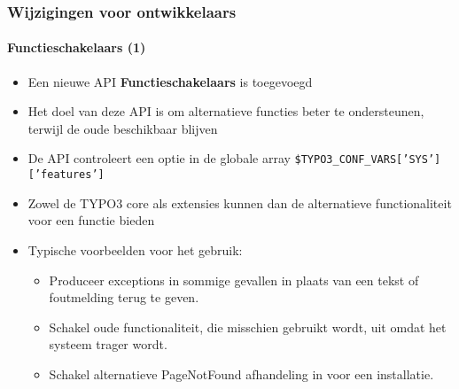 
\begin{frame}[fragile]
	\frametitle{Wijzigingen voor ontwikkelaars}
	\framesubtitle{Functieschakelaars (1)}

	\begin{itemize}
		\item Een nieuwe API \textbf{Functieschakelaars} is toegevoegd
		\item Het doel van deze API is om alternatieve functies beter te ondersteunen,
			terwijl de oude beschikbaar blijven
		\item De API controleert een optie in de globale array \newline
			\small
				\texttt{\$TYPO3\_CONF\_VARS['SYS']['features']}
			\normalsize
		\item Zowel de TYPO3 core als extensies kunnen dan de alternatieve functionaliteit voor een functie bieden
		\item Typische voorbeelden voor het gebruik:
			\smaller
			\begin{itemize}
				\item Produceer exceptions in sommige gevallen in plaats van
					een tekst of foutmelding terug te geven.
				\item Schakel oude functionaliteit, die misschien gebruikt wordt, uit omdat\newline
					het systeem trager wordt.
				\item Schakel alternatieve PageNotFound afhandeling in voor een installatie.
			\end{itemize}
			\normalsize

	\end{itemize}

\end{frame}


